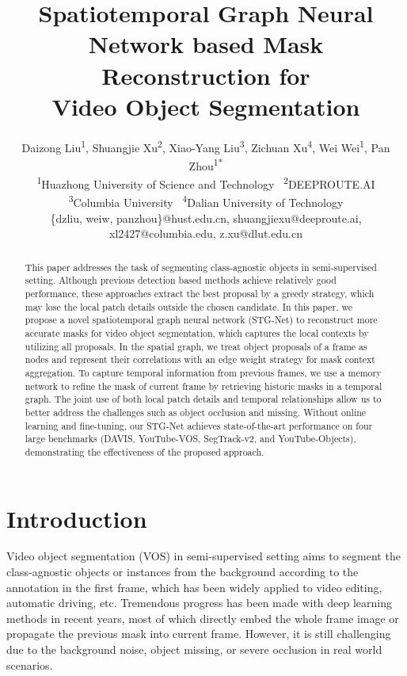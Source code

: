 \documentclass[letterpaper]{article} \usepackage{aaai21}  \usepackage{times}  \usepackage{helvet} \usepackage{courier}  \usepackage[hyphens]{url}  \usepackage{graphicx} \urlstyle{rm} \def\UrlFont{\rm}  \usepackage{graphicx}  \usepackage{natbib}  \usepackage{caption} \frenchspacing  \setlength{\pdfpagewidth}{8.5in}  \setlength{\pdfpageheight}{11in}  \usepackage{amsmath}
\title{Spatiotemporal Graph Neural Network based Mask Reconstruction for \\ Video Object Segmentation}
\author{Daizong Liu\textsuperscript{\rm 1}, Shuangjie Xu\textsuperscript{\rm 2}, Xiao-Yang Liu\textsuperscript{\rm 3}, Zichuan Xu\textsuperscript{\rm 4}, Wei Wei\textsuperscript{\rm 1}, Pan Zhou\textsuperscript{\rm 1*}\\
\textsuperscript{\rm 1}{\rm \normalsize Huazhong University of Science and Technology} \
\textsuperscript{\rm 2}{\rm \normalsize DEEPROUTE.AI}\\
\textsuperscript{\rm 3}{\rm \normalsize Columbia University} \
\textsuperscript{\rm 4}{\rm \normalsize Dalian University of Technology} \\
{\rm \normalsize \{dzliu, weiw, panzhou\}@hust.edu.cn, shuangjiexu@deeproute.ai, xl2427@columbia.edu, z.xu@dlut.edu.cn}
}
\begin{document}
\maketitle

\begin{abstract}
This paper addresses the task of segmenting class-agnostic objects in semi-supervised setting. Although previous detection based methods achieve relatively good performance, these approaches extract the best proposal by a greedy strategy, which may lose the local patch details outside the chosen candidate. In this paper, we propose a novel spatiotemporal graph neural network (STG-Net) to reconstruct more accurate masks for video object segmentation, which captures the local contexts by utilizing all proposals. In the spatial graph, we treat object proposals of a frame as nodes and represent their correlations with an edge weight strategy for mask context aggregation. To capture temporal information from previous frames, we use a memory network to refine the mask of current frame by retrieving historic masks in a temporal graph. The joint use of both local patch details and temporal relationships allow us to better address the challenges such as object occlusion and missing. Without online learning and fine-tuning, our STG-Net achieves state-of-the-art performance on four large benchmarks (DAVIS, YouTube-VOS, SegTrack-v2, and YouTube-Objects), demonstrating the effectiveness of the proposed approach.
\end{abstract}

\section{Introduction}
Video object segmentation (VOS) in semi-supervised setting aims to segment the class-agnostic objects or instances from the background according to the annotation in the first frame, which has been widely applied to video editing, automatic driving, etc.
Tremendous progress \cite{johnander2019generative,caelles2017one,wug2018fast,wang2019fast} has been made with deep learning methods in recent years,
most of which directly embed the whole frame image or propagate the previous mask into current frame.
However, it is still challenging due to the background noise, object missing, or severe occlusion in real world scenarios.
\end{document}
